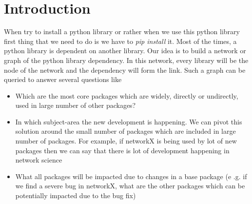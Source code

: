 \section{Introduction} \label{intro}
When try to install a python library or rather when we use this python 
library first thing that we need to do is we have to \textit{pip install} it.
Most of the times, a python library is dependent on another library. Our idea
 is to build a network or graph of the python library dependency. In this
 network, every library will be the node of the network and the dependency
 will form the link.
 Such a graph can be queried to answer several questions like
\begin{itemize}
\item Which are the most core packages which are widely, directly or
undirectly, used in large number of other packages?
\item In which subject-area the new development is happening. We can pivot
this solution around the small number of packages which are included in large
 number of packages. For example, if networkX is being used by lot of new
 packages then we can say that there is lot of development happening in
 network science
\item What all packages will be impacted due to changes in a base package (e
.g. if we find a severe bug in networkX, what are the other packages which
can be potentially impacted due to the bug fix)
\end{itemize}
\newline
  